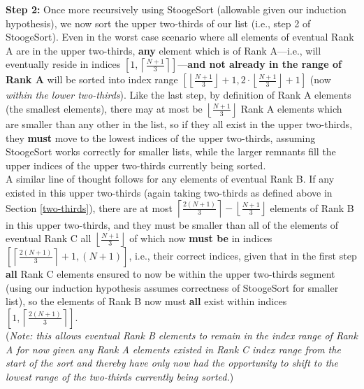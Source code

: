 \documentclass[conference]{styles/acmsiggraph}
\newcommand{\?}{\stackrel{?}{=}}
\begin{document}
\textbf{Step 2:} Once more recursively using StoogeSort (allowable given our induction hypothesis), we now sort the upper two-thirds of our list (i.e., step 2 of StoogeSort).  Even in the worst case scenario where all elements of eventual Rank A are in the upper two-thirds, \textbf{any} element which is of Rank A---i.e., will eventually reside in indices $\left [ 1, \left \lceil \frac{N+1}{3} \right \rceil \right ]$---\textbf{and not already in the range of Rank A} will be sorted into index range $\left [\left \lfloor \frac{N+1}{3}  \right \rfloor +1, 2 \cdot \left \lfloor \frac{N+1}{3}  \right \rfloor +1\right]$ (now \textit{within the lower two-thirds}).  Like the last step, by definition of Rank A elements (the smallest elements), there may at most be $\left \lfloor \frac{N+1}{3}  \right \rfloor$ Rank A elements which are smaller than any other in the list, so if they all exist in the upper two-thirds, they \textbf{must} move to the lowest indices of the upper two-thirds, assuming StoogeSort works correctly for smaller lists, while the larger remnants fill the upper indices of the upper two-thirds currently being sorted. \\

A similar line of thought follows for any elements of eventual Rank B.  If any existed in this upper two-thirds (again taking two-thirds as defined above in Section \ref{two-thirds}), there are at most $\left \lceil \frac{2(N+1)}{3} \right \rceil - \left \lfloor \frac{N+1}{3}  \right \rfloor$ elements of Rank B in this upper two-thirds, and they must be smaller than all of the elements of eventual Rank C all $\left \lfloor \frac{N+1}{3}  \right \rfloor$ of which now \textbf{must be} in indices $\left [ \left \lceil \frac{2(N+1)}{3} \right \rceil +1, (N+1) \right]$, i.e., their correct indices, given that in the first step \textbf{all} Rank C elements ensured to now be within the upper two-thirds segment (using our induction hypothesis assumes correctness of StoogeSort for smaller list), so the elements of Rank B now must \textbf{all} exist within indices $\left[1, \left \lceil \frac{2(N+1)}{3} \right \rceil \right]$.\\

(\textit{Note: this allows eventual Rank B elements to remain in the index range of Rank A for now given any Rank A elements existed in Rank C index range from the start of the sort and thereby have only now had the opportunity to shift to the lowest range of the two-thirds currently being sorted.}) \\
\end{document}
